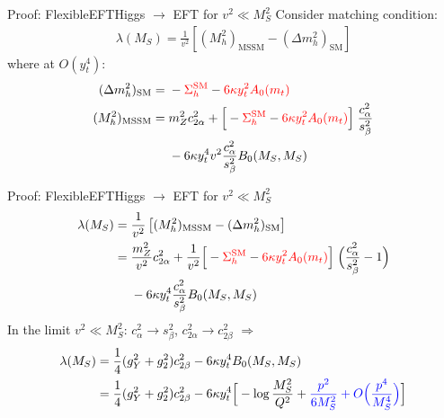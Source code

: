 \documentclass[hyperref={pdfpagelabels=false},ngerman]{beamer}
\newcommand{\MS}{\ensuremath{M_S}}
\newcommand{\SM}{\ensuremath{\text{SM}}}
\newcommand{\MSSM}{\ensuremath{\text{MSSM}}}
\begin{document}

\begin{frame}{Proof: FlexibleEFTHiggs $\rightarrow$ EFT for $v^2 \ll M_S^2$}
  Consider matching condition:
  \begin{align*}
    \lambda(\MS) = \frac{1}{v^2}\left[(M_h^2)_{\MSSM} - (\Delta m_h^2)_{\SM}\right]
  \end{align*}
  where at $O(y_t^4)$:
  \begin{align*}
    (\Delta m_h^2)_{\SM} ={}& - {\color{red}\Sigma^{\SM}_h} - {\color{red}6\kappa y_t^2 A_0(m_t)}\\
    (M_h^2)_{\MSSM} ={}& m_Z^2 c^2_{2\alpha} + \Big[ - {\color{red}\Sigma_h^\SM}
      - {\color{red} 6 \kappa y_t^2 A_0(m_t)} \Big] \; \frac{c^2_\alpha}{s^2_\beta} \\
    &- 6 \kappa y_t^4 v^2 \frac{c^2_\alpha}{s^2_\beta} B_0(\MS,\MS)
  \end{align*}
\end{frame}

\begin{frame}{Proof: FlexibleEFTHiggs $\rightarrow$ EFT for $v^2 \ll M_S^2$}
  \begin{align*}
    \lambda(\MS) ={}& \frac{1}{v^2}\left[(M_h^2)_{\MSSM} - (\Delta m_h^2)_{\SM}\right] \\
    ={}& \frac{m_Z^2}{v^2} c^2_{2\alpha}
    + \frac{1}{v^2} \Big[ - {\color{red}\Sigma_h^\SM}
    - {\color{red} 6 \kappa y_t^2 A_0(m_t)} \Big] \; \Big(\frac{c^2_\alpha}{s^2_\beta} - 1 \Big) \\
    &- 6 \kappa y_t^4 \frac{c^2_\alpha}{s^2_\beta} B_0(\MS,\MS)
  \end{align*}
  In the limit $v^2 \ll M_S^2$: $c_\alpha^2 \to s_\beta^2$, $c_{2\alpha}^2 \rightarrow c_{2\beta}^2$
  $\Rightarrow$
  \begin{align*}
    \lambda(\MS) ={}& \frac{1}{4} (g_Y^2 + g_2^2) c_{2\beta}^2
    - 6 \kappa y_t^4 B_0(\MS,\MS) \\
    ={}& \frac{1}{4} (g_Y^2 + g_2^2) c_{2\beta}^2
    - 6 \kappa y_t^4 \Big[
    - \log\frac{\MS^2}{Q^2} + \textcolor{blue}{\frac{p^2}{6 \MS^2} + O\Big(\frac{p^4}{\MS^4}\Big)} \Big]
  \end{align*}
\end{frame}

\end{document}
